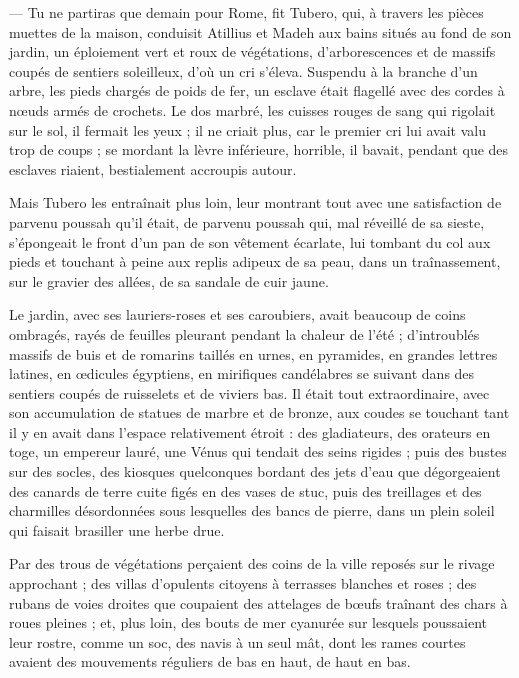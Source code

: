 \documentclass[a4paper, 11pt, oneside, polutonikogreek, french]{article}
\begin{document}
--- Tu ne partiras que demain pour Rome, fit Tubero, qui, à travers les pièces muettes de la maison, conduisit Atillius et Madeh aux bains situés au fond de son jardin, un éploiement vert et roux de végétations, d'arborescences et de massifs coupés de sentiers soleilleux, d'où un cri s'éleva. Suspendu à la branche d'un arbre, les pieds chargés de poids de fer, un esclave était flagellé avec des cordes à nœuds armés de crochets. Le dos marbré, les cuisses rouges de sang qui rigolait sur le sol, il fermait les yeux ; il ne criait plus, car le premier cri lui avait valu trop de coups ; se mordant la lèvre inférieure, horrible, il bavait, pendant que des esclaves riaient, bestialement accroupis autour.

Mais Tubero les entraînait plus loin, leur montrant tout avec une satisfaction de parvenu poussah qu'il était, de parvenu poussah qui, mal réveillé de sa sieste, s'épongeait le front d'un pan de son vêtement écarlate, lui tombant du col aux pieds et touchant à peine aux replis adipeux de sa peau, dans un traînassement, sur le gravier des allées, de sa sandale de cuir jaune.

Le jardin, avec ses lauriers-roses et ses caroubiers, avait beaucoup de coins ombragés, rayés de feuilles pleurant pendant la chaleur de l'été ; d'introublés massifs de buis et de romarins taillés en urnes, en pyramides, en grandes lettres latines, en œdicules égyptiens, en mirifiques candélabres se suivant dans des sentiers coupés de ruisselets et de viviers bas. Il était tout extraordinaire, avec son accumulation de statues de marbre et de bronze, aux coudes se touchant tant il y en avait dans l'espace relativement étroit : des gladiateurs, des orateurs en toge, un empereur lauré, une Vénus qui tendait des seins rigides ; puis des bustes sur des socles, des kiosques quelconques bordant des jets d'eau que dégorgeaient des canards de terre cuite figés en des vases de stuc, puis des treillages et des charmilles désordonnées sous lesquelles des bancs de pierre, dans un plein soleil qui faisait brasiller une herbe drue.

Par des trous de végétations perçaient des coins de la ville reposés sur le rivage approchant ; des villas d'opulents citoyens à terrasses blanches et roses ; des rubans de voies droites que coupaient des attelages de bœufs traînant des chars à roues pleines ; et, plus loin, des bouts de mer cyanurée sur lesquels poussaient leur rostre, comme un soc, des navis à un seul mât, dont les rames courtes avaient des mouvements réguliers de bas en haut, de haut en bas.
\end{document}
